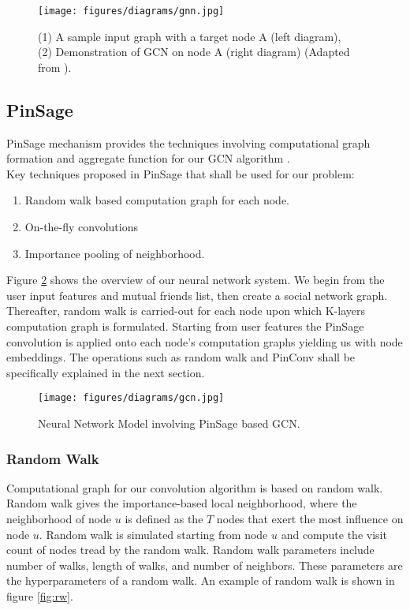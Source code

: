 \documentclass{kththesis}
\begin{document}
\begin{figure}[h!]
\centering
\captionsetup{justification=centering}
\texttt{[image: figures/diagrams/gnn.jpg]}
\caption{(1) A sample input graph with a target node A (left diagram), \\ (2) Demonstration of GCN on node A (right diagram) (Adapted from \cite{PinSage}). }
\label{fig:gnn}
\end{figure}
\subsection{PinSage}
PinSage mechanism provides the techniques involving computational graph formation and aggregate function for our GCN algorithm \cite{PinSage}. \\

\noindent Key techniques proposed in PinSage that shall be used for our problem:
\begin{enumerate}
    \item Random walk based computation graph for each node.
    \item On-the-fly convolutions
    \item Importance pooling of neighborhood.
\end{enumerate}

Figure \ref{fig:algo} shows the overview of our neural network system. We begin from the user input features and mutual friends list, then create a social network graph. Thereafter, random walk is carried-out for each node upon which K-layers computation graph is formulated. Starting from user features the PinSage convolution is applied onto each node's computation graphs yielding us with node embeddings. The operations such as random walk and PinConv shall be specifically explained in the next section.

\begin{figure}[h!]
\centering
\texttt{[image: figures/diagrams/gcn.jpg]}
\caption{Neural Network Model involving PinSage based GCN.}
\label{fig:algo}
\end{figure}

\subsubsection{Random Walk}
\noindent Computational graph for our convolution algorithm is based on random walk. Random walk gives the importance-based local neighborhood, where the neighborhood of node $u$ is defined as the $T$ nodes that exert the most influence on node $u$. Random walk is simulated starting from node $u$ and compute the visit count of nodes tread by the random walk. Random walk parameters include number of walks, length of walks, and number of neighbors. These parameters are the hyperparameters of a random walk. An example of random walk is shown in figure \ref{fig:rw}.\\
\end{document}
